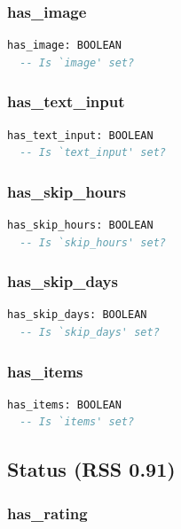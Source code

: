 \subsubsection{has\_image}

\begin{lstlisting}[language=Eiffel]
has_image: BOOLEAN
  -- Is `image' set?
\end{lstlisting}

\subsubsection{has\_text\_input}

\begin{lstlisting}[language=Eiffel]
has_text_input: BOOLEAN
  -- Is `text_input' set?
\end{lstlisting}

\subsubsection{has\_skip\_hours}

\begin{lstlisting}[language=Eiffel]
has_skip_hours: BOOLEAN
  -- Is `skip_hours' set?
\end{lstlisting}

\subsubsection{has\_skip\_days}

\begin{lstlisting}[language=Eiffel]
has_skip_days: BOOLEAN
  -- Is `skip_days' set?
\end{lstlisting}

\subsubsection{has\_items}

\begin{lstlisting}[language=Eiffel]
has_items: BOOLEAN
  -- Is `items' set?
\end{lstlisting}

\subsection{Status (RSS 0.91)}
\label{sec:channel-status-rss091}

\subsubsection{has\_rating}

